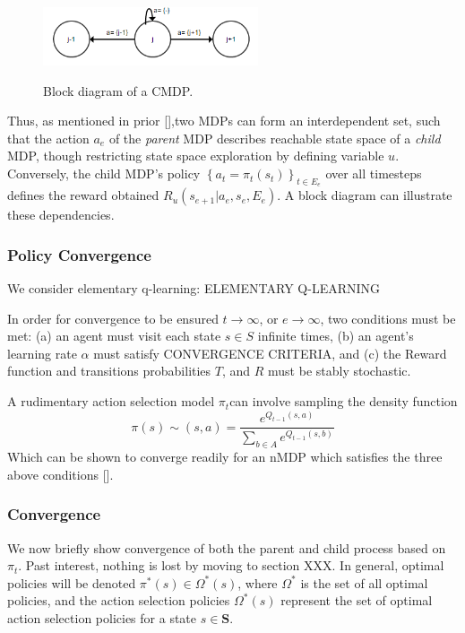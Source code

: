 \documentclass[compsoc,journal,letterpaper,10pt,draftcls,twocolumn]{IEEEtran}
\begin{document}
\begin{figure}[!t]
\centering
\includegraphics[width=2.5in]{media/image3.png}\\
\caption{\label{fig:figure3}Block diagram of a CMDP.}
\end{figure}

Thus,
as mentioned in prior {[}{]},two MDPs can form an interdependent set,
such that the action \(a_{e}\) of the \emph{parent} MDP describes
reachable state space of a \emph{child} MDP, though restricting state
space exploration by defining variable \(u\). Conversely, the child
MDP's policy
\(\left\{ a_{t} = \pi_{t}(s_{t}) \right\}_{t \in E_{e}}^{\ }\) over all
timesteps defines the reward obtained
\(R_{u}\left( s_{e + 1}|a_{e},s_{e},E_{e} \right)\). A block diagram can
illustrate these dependencies.

\subsubsection{Policy Convergence}\label{policy-convergence}

We consider elementary q-learning: ELEMENTARY Q-LEARNING

In order for convergence to be ensured \(t \rightarrow \infty\), or
\(e \rightarrow \infty\), two conditions must be met: (a) an agent must
visit each state \(s \in S\) infinite times, (b) an agent's learning
rate \(\alpha\) must satisfy CONVERGENCE CRITERIA, and (c) the Reward
function and transitions probabilities \(T\), and \(R\) must be stably
stochastic.

A rudimentary action selection model \(\pi_{t}\)can involve sampling
the density function
\begin{equation}
\pi\left( s \right) \sim \left( s, a \right) = \frac{e^{Q_{t - 1}(s, a)}}{\sum_{b \in A}e^{Q_{t - 1}(s, b)}}
\end{equation}
Which can be shown to converge readily for an nMDP which satisfies the
three above conditions {[}{]}.

\subsubsection{Convergence}\label{convergence}

We now briefly show convergence of both the parent and child process
based on \(\pi_{t}\). Past interest, nothing is lost by moving to
section XXX. In general, optimal policies will be denoted
\(\pi^{*}(s) \in \Omega^{*}(s)\), where \(\Omega^{*}\) is the set of all
optimal policies, and the action selection policies \(\Omega^{*}(s)\)
represent the set of optimal action selection policies for a state
\(s \in \mathbf{S}\).
\end{document}

